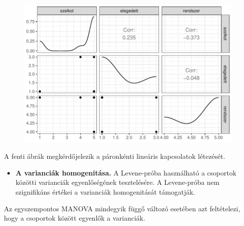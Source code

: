 \documentclass[
  letterpaper,
]{krantz}
\providecommand{\tightlist}{%
  \setlength{\itemsep}{0pt}\setlength{\parskip}{0pt}}\usepackage{longtable,booktabs,array}
\begin{document}
\begin{figure}[H]

{\centering \includegraphics{./sec_tobbvaltozos_variancia_files/figure-pdf/unnamed-chunk-19-3.pdf}

}

\end{figure}

A fenti ábrák megkérdőjelezik a páronkénti lineáris kapcsolatok
létezését.

\begin{itemize}
\tightlist
\item
  \textbf{A varianciák homogenitása.} A Levene-próba használható a
  csoportok közötti varianciák egyenlőségének tesztelésére. A
  Levene-próba nem szignifikáns értékei a varianciák homogenitását
  támogatják.
\end{itemize}

Az egyszempontos MANOVA mindegyik függő változó esetében azt
feltételezi, hogy a csoportok között egyenlők a varianciák.
\end{document}
